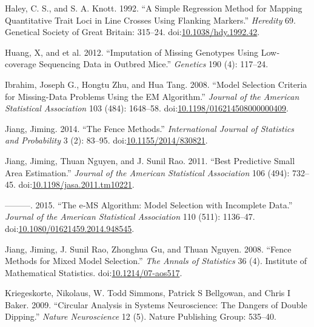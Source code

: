 \documentclass[
  12pt,
]{article}
\newlength{\cslhangindent}
\newlength{\cslentryspacingunit} %
\newenvironment{CSLReferences}[2] %
 {%
  \setlength{\parindent}{0pt}
  \ifodd #1
  \let\oldpar\par
  \def\par{\hangindent=\cslhangindent\oldpar}
  \fi
  \setlength{\parskip}{#2\cslentryspacingunit}
 }%
 {}
\begin{document}
\begin{CSLReferences}{1}{0}
\leavevmode{}%
Haley, C. S., and S. A. Knott. 1992. {``A Simple Regression Method for
Mapping Quantitative Trait Loci in Line Crosses Using Flanking
Markers.''} \emph{Heredity} 69. Genetical Society of Great Britain:
315--24.
doi:\href{https://doi.org/10.1038/hdy.1992.42}{10.1038/hdy.1992.42}.

\leavevmode{}%
Huang, X, and et al. 2012. {``Imputation of Missing Genotypes Using
Low‐coverage Sequencing Data in Outbred Mice.''} \emph{Genetics} 190
(4): 117--24.

\leavevmode{}%
Ibrahim, Joseph G., Hongtu Zhu, and Hua Tang. 2008. {``Model Selection
Criteria for Missing-Data Problems Using the EM Algorithm.''}
\emph{Journal of the American Statistical Association} 103 (484):
1648--58.
doi:\href{https://doi.org/10.1198/016214508000000409}{10.1198/016214508000000409}.

\leavevmode{}%
Jiang, Jiming. 2014. {``The Fence Methods.''} \emph{International
Journal of Statistics and Probability} 3 (2): 83--95.
doi:\href{https://doi.org/10.1155/2014/830821}{10.1155/2014/830821}.

\leavevmode{}%
Jiang, Jiming, Thuan Nguyen, and J. Sunil Rao. 2011. {``Best Predictive
Small Area Estimation.''} \emph{Journal of the American Statistical
Association} 106 (494): 732--45.
doi:\href{https://doi.org/10.1198/jasa.2011.tm10221}{10.1198/jasa.2011.tm10221}.

\leavevmode{}%
---------. 2015. {``The e‑MS Algorithm: Model Selection with Incomplete
Data.''} \emph{Journal of the American Statistical Association} 110
(511): 1136--47.
doi:\href{https://doi.org/10.1080/01621459.2014.948545}{10.1080/01621459.2014.948545}.

\leavevmode{}%
Jiang, Jiming, J. Sunil Rao, Zhonghua Gu, and Thuan Nguyen. 2008.
{``Fence Methods for Mixed Model Selection.''} \emph{The Annals of
Statistics} 36 (4). Institute of Mathematical Statistics.
doi:\href{https://doi.org/10.1214/07-aos517}{10.1214/07-aos517}.

\leavevmode{}%
Kriegeskorte, Nikolaus, W. Todd Simmons, Patrick S Bellgowan, and Chris
I Baker. 2009. {``Circular Analysis in Systems Neuroscience: The Dangers
of Double Dipping.''} \emph{Nature Neuroscience} 12 (5). Nature
Publishing Group: 535--40.


\end{CSLReferences}
\end{document}
